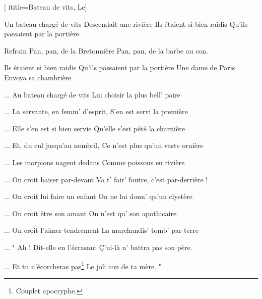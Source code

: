 [
  ititle={Bateau de vits, Le}]

  
\beginverse
Un bateau chargé de vits
Descendait une rivière
Ils étaient si bien raidis
Qu'ils passaient par la portière.
\endverse

\beginchorus
Refrain
Pan, pan, de la Bretonnière
Pan, pan, de la barbe au con.
\endchorus

\beginverse
Ils étaient si bien raidis
Qu'ils passaient par la portière
Une dame de Paris
Envoya sa chambrière
\endverse

\beginverse
... Au bateau chargé de vits
Lui choisir la plus bell' paire
\endverse

\beginverse
... La servante, en femm' d'esprit,
S'en est servi la première
\endverse

\beginverse
... Elle s'en est si bien servie
Qu'elle s'est pété la charnière
\endverse

\beginverse
... Et, du cul jusqu'au nombril,
Ce n'est plus qu'un vaste ornière
\endverse

\beginverse
... Les morpions nagent dedans
Comme poissons en rivière
\endverse

\beginverse
... On croit baiser par-devant
Va t' fair' foutre, c'est par-derrière !
\endverse

\beginverse
... On croit lui faire un enfant
On ne lui donn' qu'un clystère
\endverse

\beginverse
... On croit être son amant
On n'est qu' son apothicaire
\endverse

\beginverse
... On croit l'aimer tendrement
La marchandis' tomb' par terre
\endverse

\beginverse
... " Ah ! Dit-elle en l'écrasant
Ç'ui-là n' battra pas son père.
\endverse

\beginverse
... Et tu n'écorcheras pas\footnote{Couplet apocryphe.}
Le joli con de ta mère. "
\endverse

\endsong
